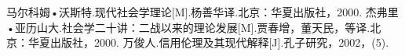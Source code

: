 \newpage
{}
{}
\begin{thebibliography}{99}
		马尔科姆•沃斯特.现代社会学理论[M].杨善华译.北京：华夏出版社，2000.
		杰弗里•亚历山大.社会学二十讲：二战以来的理论发展[M].贾春增，董天民，等译.北京：华夏出版社，2000.
		万俊人.信用伦理及其现代解释[J].孔子研究，2002，(5).
\end{thebibliography}